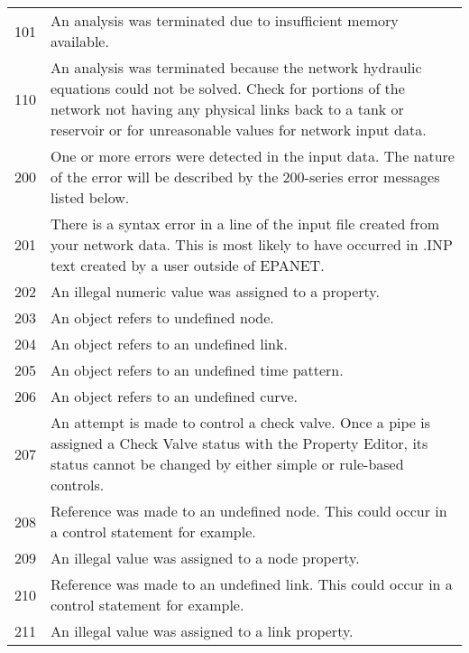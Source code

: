 \begin{longtable}{ c p{12cm}}
\hline
101& An analysis was terminated due to insufficient memory available.\\[6pt]

110& An analysis was terminated because the network hydraulic equations could
not be solved. Check for portions of the network not having any physical
links back to a tank or reservoir or for unreasonable values for network input
data.\\[6pt]

200& One or more errors were detected in the input data. The nature of the error
will be described by the 200-series error messages listed below.\\[6pt]

201& There is a syntax error in a line of the input file created from your network
data. This is most likely to have occurred in .INP text created by a user
outside of EPANET.\\[6pt]

202& An illegal numeric value was assigned to a property.\\[6pt]

203& An object refers to undefined node. \\[6pt]

204& An object refers to an undefined link.\\[6pt]

205& An object refers to an undefined time pattern.\\[6pt]

206& An object refers to an undefined curve.\\[6pt]

207& An attempt is made to control a check valve. Once a pipe is assigned a Check
Valve status with the Property Editor, its status cannot be changed by either
simple or rule-based controls. \\[6pt]

208& Reference was made to an undefined node. This could occur in a control
statement for example. \\[6pt]

209& An illegal value was assigned to a node property. \\[6pt]

210& Reference was made to an undefined link. This could occur in a control
statement for example.  \\[6pt]

211& An illegal value was assigned to a link property.   \\[6pt]


\end{longtable}
